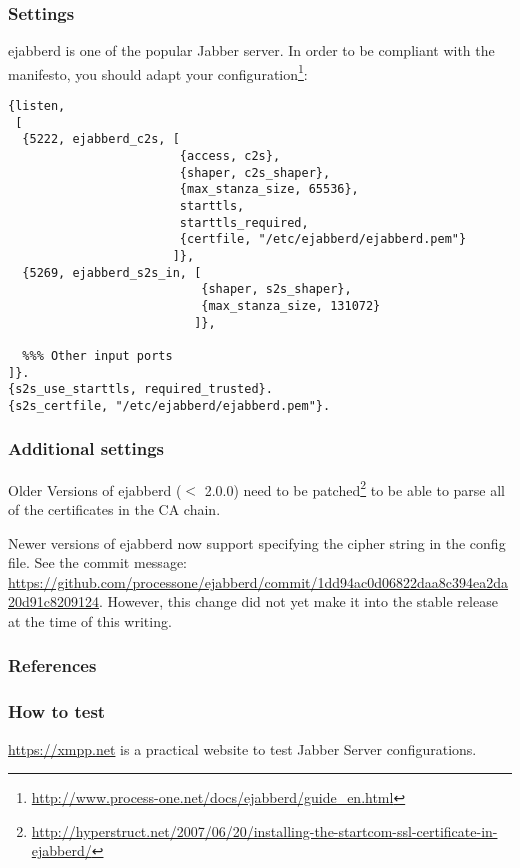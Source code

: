 \subsubsection{Settings}
ejabberd is one of the popular Jabber server. In order to be compliant
with the manifesto, you should adapt your configuration\footnote{\url{http://www.process-one.net/docs/ejabberd/guide_en.html}}:
\begin{lstlisting}
{listen,
 [
  {5222, ejabberd_c2s, [
                        {access, c2s},
                        {shaper, c2s_shaper},
                        {max_stanza_size, 65536},
                        starttls,
                        starttls_required, 
                        {certfile, "/etc/ejabberd/ejabberd.pem"}
                       ]},
  {5269, ejabberd_s2s_in, [
                           {shaper, s2s_shaper},
                           {max_stanza_size, 131072}
                          ]},

  %%% Other input ports
]}.
{s2s_use_starttls, required_trusted}.
{s2s_certfile, "/etc/ejabberd/ejabberd.pem"}.
\end{lstlisting}


\subsubsection{Additional settings}
Older Versions of ejabberd ($ < $ 2.0.0) need to be patched\footnote{\url{http://hyperstruct.net/2007/06/20/installing-the-startcom-ssl-certificate-in-ejabberd/}} to be able to parse all of the certificates in the CA chain.

Newer versions of ejabberd now support specifying the cipher string in the config file. See the commit message: \url{https://github.com/processone/ejabberd/commit/1dd94ac0d06822daa8c394ea2da20d91c8209124}. However, this change did not yet make it into the stable release at the time of this writing. 


\subsubsection{References}


\subsubsection{How to test}
\url{https://xmpp.net} is a practical website to test Jabber Server configurations.


